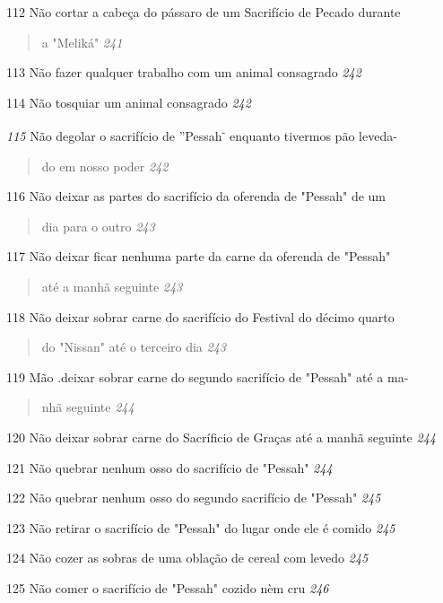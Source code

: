 112 Não cortar a cabeça do pássaro de um Sacrifício de Pecado durante

\begin{quote}
a "Meliká" \emph{241}
\end{quote}

113 Não fazer qualquer trabalho com um animal consagrado \emph{242}

114 Não tosquiar um animal consagrado \emph{242}

\emph{115} Não degolar o sacrifício de ''Pessah\textsuperscript{-}
enquanto tivermos pão leveda-

\begin{quote}
do em nosso poder \emph{242}
\end{quote}

116 Não deixar as partes do sacrifício da oferenda de "Pessah" de um

\begin{quote}
dia para o outro \emph{243}
\end{quote}

117 Não deixar ficar nenhuma parte da carne da oferenda de "Pessah"

\begin{quote}
até a manhã seguinte \emph{243}
\end{quote}

118 Não deixar sobrar carne do sacrifício do Festival do décimo quarto

\begin{quote}
do "Nissan" até o terceiro dia \emph{243}
\end{quote}

119 Mão .deixar sobrar carne do segundo sacrifício de "Pessah" até a ma-

\begin{quote}
nhã seguinte \emph{244}
\end{quote}

120 Não deixar sobrar carne do Sacríficio de Graças até a manhã seguinte
\emph{244}

121 Não quebrar nenhum osso do sacrifício de "Pessah" \emph{244}

122 Não quebrar nenhum osso do segundo sacrifício de "Pessah" \emph{245}

123 Não retirar o sacrifício de "Pessah" do lugar onde ele é comido
\emph{245}

124 Não cozer as sobras de uma oblação de cereal com levedo \emph{245}

125 Não comer o sacrifício de "Pessah" cozido nèm cru \emph{246}

